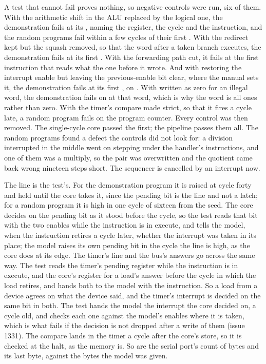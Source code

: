 \documentclass[journal,onecolumn,9pt]{IEEEtran}
\begin{document}
A test that cannot fail proves nothing, so negative controls were
run, six of them. With the arithmetic shift in the ALU replaced by the
logical one, the demonstration fails at its , naming the
register, the cycle and the instruction, and the random programs
fail within a few cycles of their first . With the redirect
kept but the squash removed, so that the word after a taken branch
executes, the demonstration fails at its first . With the
forwarding path cut, it fails at the first instruction that reads
what the one before it wrote. And with  restoring the
interrupt enable but leaving the previous-enable bit clear, where
the manual sets it, the demonstration fails at its first
, on . With  written as
zero for an illegal word, the demonstration fails on 
at that word, which is why the word is all ones rather than zero.
With the timer's compare made strict, so that it fires a cycle late,
a random program fails on the program counter. Every control was
then removed. The single-cycle core passed the
first; the pipeline passes them all. The random programs found a
defect the controls did not look for: a division interrupted in the
middle went on stepping under the handler's instructions, and one of
them was a multiply, so the pair was overwritten and the quotient
came back wrong nineteen steps short. The sequencer is cancelled by
an interrupt now.

The line is the test's. For the demonstration program it is
raised at cycle forty and held until the core takes it, since the
pending bit is the line and not a latch; for a random program it is high in one cycle of sixteen
from the seed. The core decides on the pending bit as it stood
before the cycle, so the test reads that bit with the two enables
while the instruction is in execute, and tells the model, when the
instruction retires a cycle later, whether the interrupt was taken
in its place; the model raises its own pending bit in the cycle the
line is high, as the core does at its edge. The timer's line and
the bus's answers go across the same way. The test reads the timer's
pending register while the instruction is in execute, and the core's
register for a load's answer before the cycle in which the load
retires, and hands both to the model with the instruction. So a load
from a device agrees on what the device said, and the timer's
interrupt is decided on the same bit in both. The test hands the model
the interrupt the core decided on, a cycle old, and checks each one
against the model's enables where it is taken, which is what fails
if the decision is not dropped after a write of them (issue 1331). The compare lands in
the timer a cycle after the core's store, so it is checked at the
halt, as the memory is. So are the serial port's count of bytes and
its last byte, against the bytes the model was given.
\end{document}
